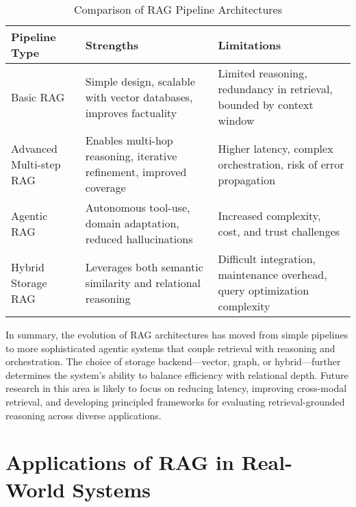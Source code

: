 \documentclass[conference]{IEEEtran}
\begin{document}
\begin{table}[ht]
\caption{Comparison of RAG Pipeline Architectures}
\label{tab:rag_architectures}
\renewcommand{\arraystretch}{1.2}
\begin{tabularx}{\linewidth}{p{2.5cm} X X}
\toprule
\textbf{Pipeline Type} & \textbf{Strengths} & \textbf{Limitations} \\
\midrule
Basic RAG & Simple design, scalable with vector databases, improves factuality & Limited reasoning, redundancy in retrieval, bounded by context window \\
Advanced Multi-step RAG & Enables multi-hop reasoning, iterative refinement, improved coverage & Higher latency, complex orchestration, risk of error propagation \\
Agentic RAG & Autonomous tool-use, domain adaptation, reduced hallucinations & Increased complexity, cost, and trust challenges \\
Hybrid Storage RAG & Leverages both semantic similarity and relational reasoning & Difficult integration, maintenance overhead, query optimization complexity \\
\bottomrule
\end{tabularx}
\end{table}

In summary, the evolution of RAG architectures has moved from simple pipelines to more sophisticated agentic systems that couple retrieval with reasoning and orchestration. The choice of storage backend—vector, graph, or hybrid—further determines the system’s ability to balance efficiency with relational depth. Future research in this area is likely to focus on reducing latency, improving cross-modal retrieval, and developing principled frameworks for evaluating retrieval-grounded reasoning across diverse applications.


\section{Applications of RAG in Real-World Systems}
\end{document}
